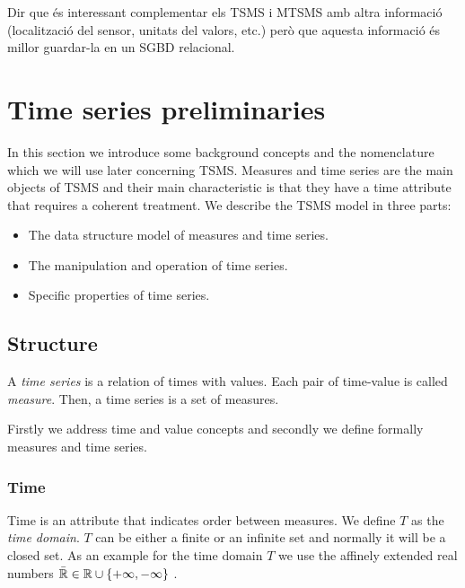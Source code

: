 Dir que és interessant complementar els TSMS i MTSMS amb altra informació (localització del sensor, unitats del valors, etc.) però que aquesta informació és millor guardar-la en un SGBD relacional.



\section{Time series preliminaries}
\label{sec:model:preliminaries}




In this section we introduce some background concepts and the
nomenclature which we will use later concerning TSMS. Measures and
time series are the main objects of TSMS and their main characteristic
is that they have a time attribute that requires a coherent
treatment. We describe the TSMS model in three parts:

\begin{itemize}
\item The data structure model of measures and time series.
\item The manipulation and operation of time series.
\item Specific properties of time series.
\end{itemize}





\subsection{Structure}

A \emph{time series} is a relation of times with values. Each pair of
time-value is called \emph{measure}. Then, a time series is a set of
measures. 

Firstly we address time and value concepts and secondly we define formally
measures and time series.


\subsubsection{Time}

Time is an attribute that indicates order between measures. We define
$T$ as the \emph{time domain}. $T$ can be either a finite or an infinite set
and normally it will be a closed set. As an example for the time
domain $T$ we use the affinely extended real numbers $\bar{\mathbb{R}} \in \mathbb{R} \cup
\{+\infty,-\infty\}$ \cite{cantrell:extendedreal}.

